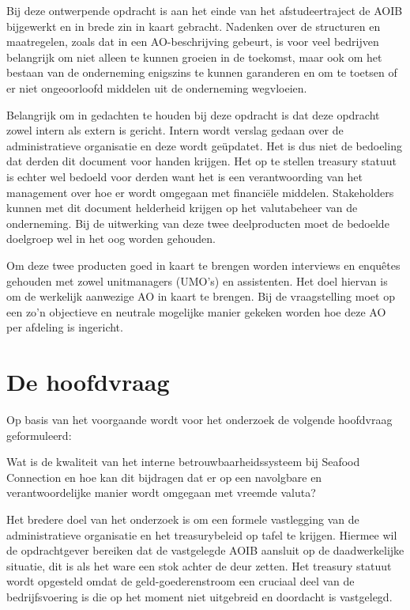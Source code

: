 \documentclass[10pt,a4paper,twoside]{report}
\begin{document}
Bij deze ontwerpende opdracht is aan het einde van het afstudeertraject de AOIB bijgewerkt en in brede zin in kaart gebracht. Nadenken over de structuren en maatregelen, zoals dat in een AO-beschrijving gebeurt, is voor veel bedrijven belangrijk om niet alleen te kunnen groeien in de toekomst, maar ook om het bestaan van de onderneming enigszins te kunnen garanderen en om te toetsen of er niet ongeoorloofd middelen uit de onderneming wegvloeien.

Belangrijk om in gedachten te houden bij deze opdracht is dat deze opdracht zowel intern als extern is gericht. Intern wordt verslag gedaan over de administratieve organisatie en deze wordt geüpdatet. Het is dus niet de bedoeling dat derden dit document voor handen krijgen. Het op te stellen treasury statuut is echter wel bedoeld voor derden want het is een verantwoording van het management over hoe er wordt omgegaan met financiële middelen. Stakeholders kunnen met dit document helderheid krijgen op het valutabeheer van de onderneming. Bij de uitwerking van deze twee deelproducten moet de bedoelde doelgroep wel in het oog worden gehouden.

Om deze twee producten goed in kaart te brengen worden interviews en enquêtes gehouden met zowel unitmanagers (UMO's) en assistenten. Het doel hiervan is om de werkelijk aanwezige AO in kaart te brengen. Bij de vraagstelling moet op een zo'n objectieve en neutrale mogelijke manier gekeken worden hoe deze AO per afdeling is ingericht.

\newpage
    \section{De hoofdvraag}
Op basis van het voorgaande wordt voor het onderzoek de volgende hoofdvraag geformuleerd:

\bigskip

\noindent
\begin{center}
\textnormal{\large{Wat is de kwaliteit van het interne betrouwbaarheidssysteem bij Seafood Connection en hoe kan dit bijdragen dat er op een navolgbare en verantwoordelijke manier wordt omgegaan met vreemde valuta?}}
\end{center}

\bigskip

Het bredere doel van het onderzoek is om een formele vastlegging van de administratieve organisatie en het treasurybeleid op tafel te krijgen. Hiermee wil de opdrachtgever bereiken dat de vastgelegde AOIB aansluit op de daadwerkelijke situatie, dit is als het ware een stok achter de deur zetten. Het treasury statuut wordt opgesteld omdat de geld-goederenstroom een cruciaal deel van de bedrijfsvoering is die op het moment niet uitgebreid en doordacht is vastgelegd.
\end{document}
